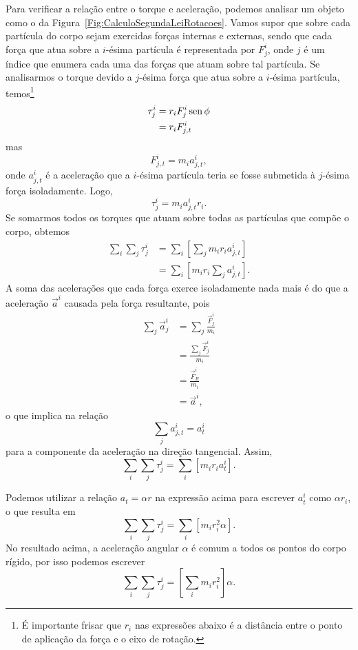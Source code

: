 Para verificar a relação entre o torque e aceleração, podemos analisar um objeto como o da Figura~\ref{Fig:CalculoSegundaLeiRotacoes}. Vamos supor que sobre cada partícula do corpo sejam exercidas forças internas e externas, sendo que cada força que atua sobre a $i$-ésima partícula é representada por $F_j^i$, onde $j$ é um índice que enumera cada uma das forças que atuam sobre tal partícula. Se analisarmos o torque devido a $j$-ésima força que atua sobre a $i$-ésima partícula, temos\footnote{É importante frisar que $r_i$ nas expressões abaixo é a distância entre o ponto de aplicação da força e o eixo de rotação.}
\begin{align}
	\tau_j^i &= r_i F_j^i \operatorname{sen}\phi \\
	&= r_i F_{j,t}^i
\end{align}
%
mas
\begin{equation}
	F_{j,t}^{i} = m_i a_{j,t}^{i},
\end{equation}
%
onde $a_{j,t}^i$ é a aceleração que a $i$-ésima partícula teria se fosse submetida à $j$-ésima força isoladamente.
%
Logo,
\begin{equation}
	\tau_j^i = m_i a_{j,t}^{i} r_i.
\end{equation}
%
Se somarmos todos os torques que atuam sobre todas as partículas que compõe o corpo, obtemos
\begin{align}
	\sum_i \sum_j \tau_j^i &= \sum_{i}\left[ \sum_j m_i r_i a_{j,t}^i\right] \\
	&= \sum_{i}\left[m_i r_i \sum_j a_{j,t}^i\right].
\end{align}
%
A soma das acelerações que cada força exerce isoladamente nada mais é do que a aceleração $\vec{a}^i$ causada pela força resultante, pois
\begin{align}
    \sum_j \vec{a}_{j}^i &= \sum_j \frac{\vec{F}_{j}^i}{m_i} \\
    &= \frac{\sum_j \vec{F}_j^i}{m_i} \\
    &= \frac{\vec{F}_R^i}{m_i} \\
    &= \vec{a}^i,
\end{align}
%
o que implica na relação
\begin{equation}
    \sum_j a_{j,t}^i = a_t^i
\end{equation}
%
para a componente da aceleração na direção tangencial. Assim,
\begin{equation}
	\sum_i \sum_j \tau_j^i = \sum_{i}[m_i r_i a_{t}^i].
\end{equation}

Podemos utilizar a relação $a_t = \alpha r$ na expressão acima para escrever $a_{t}^i$ como $\alpha r_i$, o que resulta em
\begin{equation}
	\sum_i \sum_j \tau_j^i = \sum_{i}[m_i r_i^2 \alpha].
\end{equation}
%
No resultado acima, a aceleração angular $\alpha$ é comum a todos os pontos do corpo rígido, por isso podemos escrever
\begin{equation}
	\sum_i \sum_j \tau_j^i =  \left[\sum_{i} m_i r_i^2\right] \alpha.
\end{equation}

